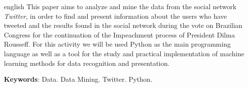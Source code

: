 \begin{resumo}[ABSTRACT]
 \begin{otherlanguage*}{english}
This paper aims to analyze and mine the data from the social network \textit{Twitter}, in order to find and present information about the users who have tweeted and the results found in the social network during the vote on Brazilian Congress for the continuation of the Impeachment process of President Dilma Rousseff. For this activity we will be used Python as the main programming language as well as a tool for the study and practical implementation of machine learning methods for data recognition and presentation.

   
   \vspace{\onelineskip}
 
   \noindent 
   \textbf{Keywords}: Data. Data Mining. Twitter. Python.
 \end{otherlanguage*}
\end{resumo}

